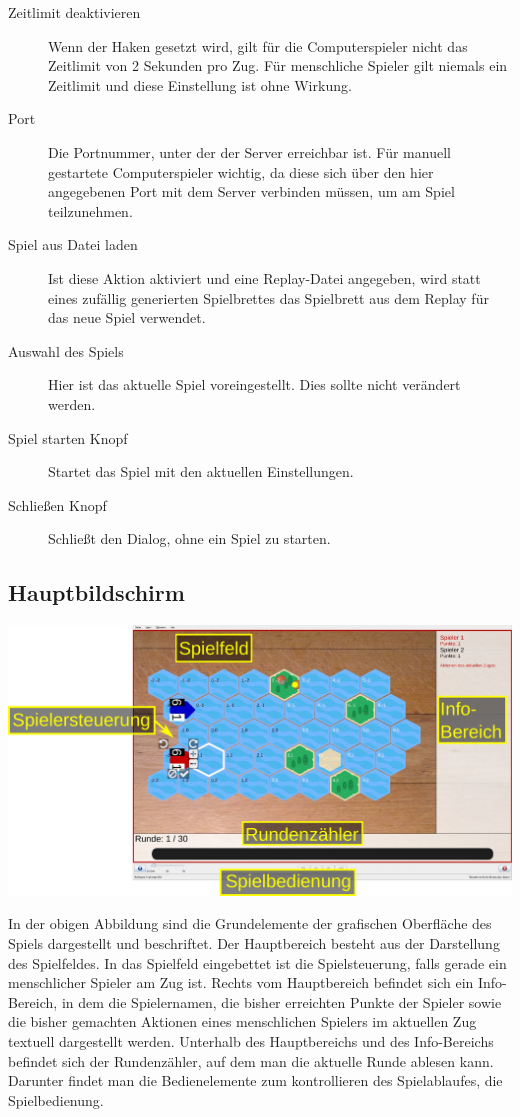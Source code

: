 \documentclass[12pt,a4paper, ngerman, oneside]{scrartcl}
\begin{document}
\begin{description}
\item [Zeitlimit deaktivieren] Wenn der Haken gesetzt wird, gilt für die Computerspieler nicht das Zeitlimit von 2 Sekunden pro Zug. Für menschliche Spieler gilt niemals ein Zeitlimit und diese Einstellung ist ohne Wirkung.
\item [Port] Die Portnummer, unter der der Server erreichbar ist. Für manuell gestartete Computerspieler wichtig, da diese sich über den hier angegebenen Port mit dem Server verbinden müssen, um am Spiel teilzunehmen.
\item [Spiel aus Datei laden] Ist diese Aktion aktiviert und eine Replay-Datei angegeben, wird statt eines zufällig generierten Spielbrettes das Spielbrett aus dem Replay für das neue Spiel verwendet.
\item [Auswahl des Spiels] Hier ist das aktuelle Spiel voreingestellt. Dies sollte nicht verändert werden.
\item [Spiel starten Knopf] Startet das Spiel mit den aktuellen Einstellungen.
\item [Schließen Knopf] Schließt den Dialog, ohne ein Spiel zu starten.
\end{description}

\subsection{Hauptbildschirm}

\begin{centering}
  \includegraphics[width=\textwidth]{bilder/gui-elemente.pdf}
\end{centering}

In der obigen Abbildung sind die Grundelemente der grafischen Oberfläche des
Spiels dargestellt und beschriftet. Der Hauptbereich besteht aus der Darstellung
des Spielfeldes. In das Spielfeld eingebettet ist die Spielsteuerung, falls
gerade ein menschlicher Spieler am Zug ist. Rechts vom Hauptbereich befindet
sich ein Info-Bereich, in dem die Spielernamen, die bisher erreichten Punkte der
Spieler sowie die bisher gemachten Aktionen eines menschlichen Spielers im
aktuellen Zug textuell dargestellt werden. Unterhalb des Hauptbereichs und des
Info-Bereichs befindet sich der Rundenzähler, auf dem man die aktuelle Runde
ablesen kann. Darunter findet man die Bedienelemente zum kontrollieren des
Spielablaufes, die Spielbedienung.
\end{document}
